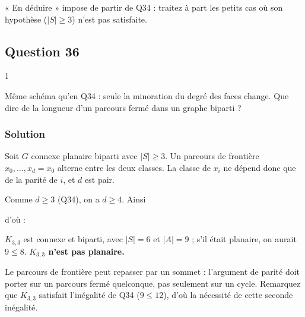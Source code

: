 \documentclass[11pt,a4paper]{article}
\newcommand{\equationajustee}[1]{%
  \sbox{\boiteequation}{$\displaystyle #1$}%
  \ifdim\wd\boiteequation>\linewidth
    \[\resizebox{\linewidth}{!}{\usebox{\boiteequation}}\]%
  \else
    \[#1\]%
  \fi}
\begin{document}
\begin{methode}

« En déduire » impose de partir de Q34 : traitez à part les petits cas où son hypothèse (\(|S| \ge 3\)) n'est pas satisfaite.

\end{methode}

\hypertarget{question-36}{%
\subsection{Question 36}\label{question-36}}

\begin{indication}{1}

Même schéma qu'en Q34 : seule la minoration du degré des faces change. Que dire de la longueur d'un parcours fermé dans un graphe biparti ?

\end{indication}

\hypertarget{solution-35}{%
\subsubsection{Solution}\label{solution-35}}

Soit \(G\) connexe planaire biparti avec \(|S| \ge 3\). Un parcours de frontière \(x_0, \dots, x_d = x_0\) alterne entre les deux classes. La classe de \(x_i\) ne dépend donc que de la parité de \(i\), et \(d\) est pair.

Comme \(d \ge 3\) (Q34), on a \(d \ge 4\). Ainsi

\equationajustee{\begin{aligned}
2|A| &\ge 4|F| \\
&= 4(2 - |S| + |A|),
\end{aligned}}

d'où :

\equationajustee{\boxed{\,|A| \le 2|S| - 4\,}}

\(K_{3,3}\) est connexe et biparti, avec \(|S| = 6\) et \(|A| = 9\) ; s'il était planaire, on aurait \(9 \le 8\). \textbf{\(K_{3,3}\) n'est pas planaire.}

\begin{piege}

Le parcours de frontière peut repasser par un sommet : l'argument de parité doit porter sur un parcours fermé quelconque, pas seulement sur un cycle. Remarquez que \(K_{3,3}\) satisfait l'inégalité de Q34 (\(9 \le 12\)), d'où la nécessité de cette seconde inégalité.

\end{piege}
\end{document}
